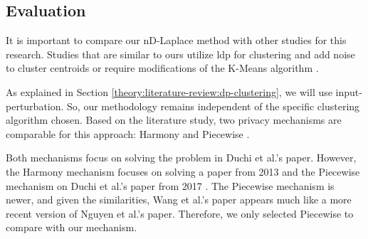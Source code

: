 \subsection{Evaluation}
It is important to compare our nD-Laplace method with other studies for this research.
Studies that are similar to ours utilize \gls{ldp} for clustering and add noise to cluster centroids \citep{xia_distributed_2020, yuan_privacypreserving_2021, 9679364} or require modifications of the K-Means algorithm \citep{sun_distributed_2019}.

As explained in Section \ref{theory:literature-review:dp-clustering}, we will use input-perturbation.
So, our methodology remains independent of the specific clustering algorithm chosen.
Based on the literature study, two privacy mechanisms are comparable for this approach: Harmony \citep{nguyen_collecting_2016} and Piecewise \citep{wang_collecting_2019}.

Both mechanisms focus on solving the problem in Duchi et al.'s paper.
However, the Harmony mechanism focuses on solving a paper from 2013 \citep{duchi_privacy_2013} and the Piecewise mechanism on Duchi et al.'s paper from 2017 \citep{duchi_minimax_2017}.
The Piecewise mechanism is newer, and given the similarities, Wang et al.'s paper appears much like a more recent version of Nguyen et al.'s paper.
Therefore, we only selected Piecewise to compare with our mechanism.

